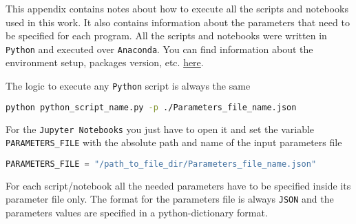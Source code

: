 This appendix contains notes about how to execute all the scripts and notebooks used in this work. It also contains information about the parameters that need to be specified for each program.
All the scripts and notebooks were written in \texttt{Python} and executed over \texttt{Anaconda}. You can find information about the environment setup, packages version, etc. \href{https://github.com/andresbecker/master_thesis}{here}.

The logic to execute any \texttt{Python} script is always the same
\begin{lstlisting}[language=Bash]
python python_script_name.py -p ./Parameters_file_name.json
\end{lstlisting}

For the \texttt{Jupyter Notebooks} you just have to open it and set the variable \\
\noindent\texttt{PARAMETERS\_FILE} with the absolute path and name of the input parameters file
\begin{lstlisting}[language=Python]
PARAMETERS_FILE = "/path_to_file_dir/Parameters_file_name.json"
\end{lstlisting}

For each script/notebook all the needed parameters have to be specified inside its parameter file only. The format for the parameters file is always \texttt{JSON} and the parameters values are specified in a python-dictionary format.

